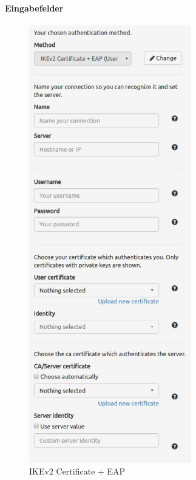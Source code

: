 \noindent\begin{minipage}[t]{0.5\textwidth}
\vspace{0pt}
\paragraph{Eingabefelder}\mbox{}\medskip
    \begin{figure}[H]
    	\centering
    	\includegraphics[width=200pt]{images/forms/cert_eap_form.jpg}
    	\caption{IKEv2 Certificate + EAP}
    \end{figure}
\end{minipage}
\hfill
